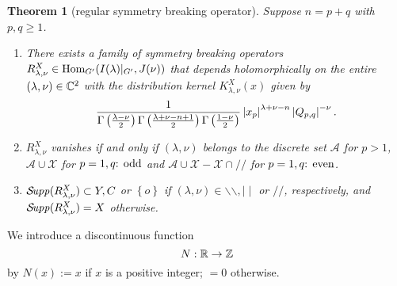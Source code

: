 \documentclass[reqno,12pt]{pja00} %
\newtheorem{theorem}{Theorem}[section]
\newcommand{\Hom}{\mbox{\normalfont Hom}}
\newcommand{\Supp}{\mathcal{S}\!{\it upp}}
\theoremstyle{definition}
\theoremstyle{exampstyle} \newtheorem{examp}[theorem]{Theorem}
\renewcommand{\Q}{Q_{p,q}}
\newcommand{\teven}{\mbox{\textrm{: even}}}
\newcommand{\todd}{\mbox{\textrm{: odd}}}
\begin{document}
\begin{theorem}[regular symmetry breaking operator]
	Suppose $n=p+q$ with $p,q\ge1$.
	\begin{enumerate}[(1)]
		\item There exists a family of symmetry breaking operators $R_{\lambda,\nu}^X\in\Hom_{G'}(I(\lambda)\kern-0.1cm\mid_{G'},J(\nu))$ that depends 
			holomorphically on the entire $(\lambda,\nu)\in\mathbb{C}^2$ with the distribution kernel $K_{\lambda,\nu}^X(x)$ given by\begin{equation*}
		\frac{1}{\Gamma\left( \frac{\lambda-\nu}{2}\right)\Gamma\left( \frac{\lambda+\nu-n+1}{2}\right)\Gamma\left( \frac{1-\nu}{2}   \right)}\myabs{x_p}^{\lambda+\nu-n}
		\myabs{\Q}^{-\nu}.
	\end{equation*}
\item 
	$R^X_{\lambda,\nu}$ vanishes if and only if $(\lambda,\nu)$ belongs to the discrete set $\mathcal{A}$ for $p>1$, $\mathcal{A}\cup\mathcal{X}$ for $p=1,q\todd$
	and $\mathcal{A}\cup\mathcal{X}-\mathcal{X}\cap//$ for $p=1,q\teven$.
\item 
	$\Supp(R_{\lambda,\nu}^X)\subset Y,C$ or $\left\{ o \right\}$ if $(\lambda,\nu)\in\backslash\backslash,\mid\mid$ or $//$, respectively, and $\Supp(R_{\lambda,\nu}^X)=X$
	otherwise.
	\end{enumerate}
\end{theorem}
We introduce a discontinuous function\begin{equation*}
	N:\R\to\Z
\end{equation*}by $N(x):=x$ if $x$ is a positive integer; $=0$ otherwise.
\end{document}
